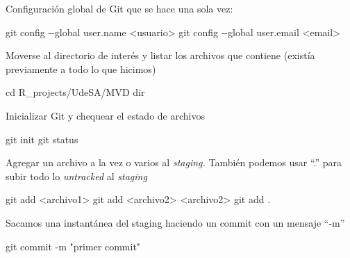 \documentclass[
  letterpaper,
  DIV=11,
  numbers=noendperiod]{scrartcl}
\newenvironment{Shaded}{\begin{snugshade}}{\end{snugshade}}
\newcommand{\FunctionTok}[1]{\textcolor[rgb]{0.28,0.35,0.67}{#1}}
\newcommand{\NormalTok}[1]{\textcolor[rgb]{0.00,0.23,0.31}{#1}}
\newcommand{\OperatorTok}[1]{\textcolor[rgb]{0.37,0.37,0.37}{#1}}
\newcommand{\StringTok}[1]{\textcolor[rgb]{0.13,0.47,0.30}{#1}}
\begin{document}
Configuración global de Git que se hace una sola vez:

\begin{Shaded}
\begin{Highlighting}[]
\NormalTok{git config }\OperatorTok{{-}{-}}\NormalTok{global user}\OperatorTok{.}\FunctionTok{name} \OperatorTok{\textless{}}\NormalTok{usuario}\OperatorTok{\textgreater{}}
\NormalTok{git config }\OperatorTok{{-}{-}}\NormalTok{global user}\OperatorTok{.}\FunctionTok{email} \OperatorTok{\textless{}}\NormalTok{email}\OperatorTok{\textgreater{}}
\end{Highlighting}
\end{Shaded}

Moverse al directorio de interés y listar los archivos que contiene
(existía previamente a todo lo que hicimos)

\begin{Shaded}
\begin{Highlighting}[]
\FunctionTok{cd}\NormalTok{ R\_projects}\OperatorTok{/}\NormalTok{UdeSA}\OperatorTok{/}\NormalTok{MVD}
\FunctionTok{dir}
\end{Highlighting}
\end{Shaded}

Inicializar Git y chequear el estado de archivos

\begin{Shaded}
\begin{Highlighting}[]
\NormalTok{git init}
\NormalTok{git status}
\end{Highlighting}
\end{Shaded}

Agregar un archivo a la vez o varios al \emph{staging.} También podemos
usar ``.'' para subir todo lo \emph{untracked} al \emph{staging}

\begin{Shaded}
\begin{Highlighting}[]
\NormalTok{git add }\OperatorTok{\textless{}}\NormalTok{archivo1}\OperatorTok{\textgreater{}}\NormalTok{ git add }\OperatorTok{\textless{}}\NormalTok{archivo2}\OperatorTok{\textgreater{}} \OperatorTok{\textless{}}\NormalTok{archivo2}\OperatorTok{\textgreater{}}
\NormalTok{git add }\OperatorTok{.}
\end{Highlighting}
\end{Shaded}

Sacamos una instantánea del staging haciendo un commit con un mensaje
``-m''

\begin{Shaded}
\begin{Highlighting}[]
\NormalTok{git commit }\OperatorTok{{-}}\NormalTok{m }\StringTok{"primer commit"}
\end{Highlighting}
\end{Shaded}
\end{document}
